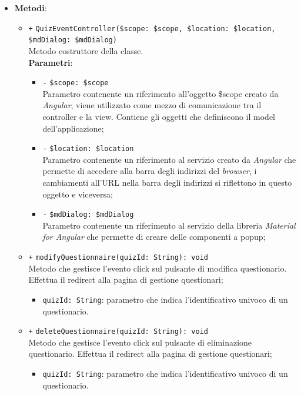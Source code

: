\begin{itemize}
\begin{itemize}
	\end{itemize}
	\item \textbf{Metodi}:
	\begin{itemize}
		\item \texttt{+} \texttt{QuizEventController(\$scope: \$scope, \$location: \$location, \$mdDialog: \$mdDialog)} \\ Metodo costruttore della classe. \\
		\textbf{Parametri}:
		\begin{itemize}
			\item \texttt{-} \texttt{\$scope: \$scope} \\
			Parametro contenente un riferimento all’oggetto \$scope creato da \textit{Angular}, viene utilizzato come mezzo di comunicazione tra il controller e la view. Contiene gli oggetti che definiscono il model dell’applicazione;
			\item \texttt{-} \texttt{\$location: \$location} \\
		    Parametro contenente un riferimento al servizio creato da \textit{Angular} che permette di accedere alla barra degli indirizzi del \textit{browser}, i cambiamenti all’URL nella barra degli indirizzi si riflettono in questo oggetto e viceversa;
			\item \texttt{-} \texttt{\$mdDialog: \$mdDialog} \\
			Parametro contenente un riferimento al servizio della libreria \textit{Material for Angular} che permette di creare delle componenti a popup;
		\end{itemize}
		\item \texttt{+} \texttt{modifyQuestionnaire(quizId: String): void} \\
		Metodo che gestisce l’evento click sul pulsante di modifica questionario. Effettua il redirect alla pagina di gestione questionari;
		\begin{itemize}
			\item \texttt{quizId: String}: parametro che indica l'identificativo univoco di un questionario.
		\end{itemize}
		\item \texttt{+} \texttt{deleteQuestionnaire(quizId: String): void} \\
		Metodo che gestisce l’evento click sul pulsante di eliminazione questionario. Effettua il redirect alla pagina di gestione questionari;  
		\begin{itemize}
			\item \texttt{quizId: String}: parametro che indica l'identificativo univoco di un questionario.

\end{itemize}
\end{itemize}
\end{itemize}
